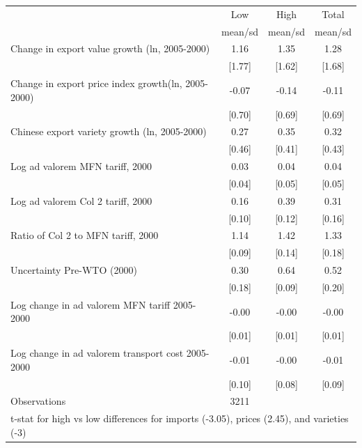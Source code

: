 \begin{tabular}{lccc}
\toprule
 & Low & High & Total \\
 & mean/sd & mean/sd & mean/sd \\
\midrule
Change in export value growth (ln, 2005-2000) & 1.16 & 1.35 & 1.28 \\
 & [1.77] & [1.62] & [1.68] \\
Change in export price index growth(ln, 2005-2000) & -0.07 & -0.14 & -0.11 \\
 & [0.70] & [0.69] & [0.69] \\
Chinese export variety growth (ln, 2005-2000) & 0.27 & 0.35 & 0.32 \\
 & [0.46] & [0.41] & [0.43] \\
Log ad valorem MFN tariff, 2000 & 0.03 & 0.04 & 0.04 \\
 & [0.04] & [0.05] & [0.05] \\
Log ad valorem Col 2 tariff, 2000 & 0.16 & 0.39 & 0.31 \\
 & [0.10] & [0.12] & [0.16] \\
Ratio of Col 2 to MFN tariff, 2000 & 1.14 & 1.42 & 1.33 \\
 & [0.09] & [0.14] & [0.18] \\
Uncertainty Pre-WTO (2000) & 0.30 & 0.64 & 0.52 \\
 & [0.18] & [0.09] & [0.20] \\
Log change in ad valorem MFN tariff 2005-2000 & -0.00 & -0.00 & -0.00 \\
 & [0.01] & [0.01] & [0.01] \\
Log change in ad valorem transport cost 2005-2000 & -0.01 & -0.00 & -0.01 \\
 & [0.10] & [0.08] & [0.09] \\
\midrule
Observations & 3211 &  &  \\
\multicolumn{4}{l}{\footnotesize t-stat for high vs low differences for imports (-3.05), prices (2.45), and varieties (-3)} \\
\bottomrule
\end{tabular}
